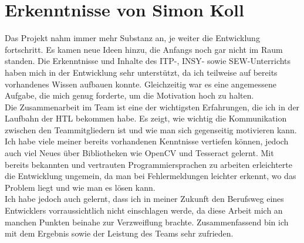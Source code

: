 \section{Erkenntnisse von Simon Koll}

Das Projekt nahm immer mehr Substanz an, je weiter die Entwicklung fortschritt. Es kamen neue Ideen hinzu, die Anfangs noch gar nicht im Raum standen. Die Erkenntnisse und Inhalte des ITP-, INSY- sowie SEW-Unterrichts haben mich in der Entwicklung sehr unterstützt, da ich teilweise auf bereits vorhandenes Wissen aufbauen konnte. Gleichzeitig war es eine angemessene Aufgabe, die mich genug forderte, um die Motivation hoch zu halten. \\
Die Zusammenarbeit im Team ist eine der wichtigsten Erfahrungen, die ich in der Laufbahn der HTL bekommen habe. Es zeigt, wie wichtig die Kommunikation zwischen den Teammitgliedern ist und wie man sich gegenseitig motivieren kann.\\
Ich habe viele meiner bereits vorhandenen Kenntnisse vertiefen können, jedoch auch viel Neues über Bibliotheken wie OpenCV und Tesseract gelernt. Mit bereits bekannten und vertrauten Programmiersprachen zu arbeiten erleichterte die Entwicklung ungemein, da man bei Fehlermeldungen leichter erkennt, wo das Problem liegt und wie man es lösen kann.\\
Ich habe jedoch auch gelernt, dass ich in meiner Zukunft den Berufsweg eines Entwicklers vorraussichtlich nicht einschlagen werde, da diese Arbeit mich an manchen Punkten beinahe zur Verzweiflung brachte.
Zusammenfassend bin ich mit dem Ergebnis sowie der Leistung des Teams sehr zufrieden. 
